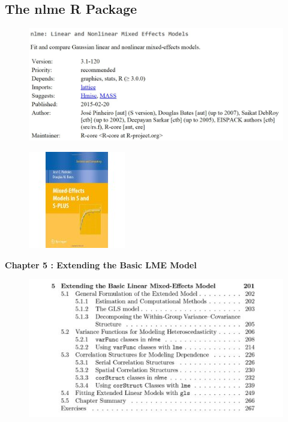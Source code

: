 \documentclass[compress]{beamer}        %
\begin{document}
	\subsection{The nlme R Package}					
				\begin{frame}
					\begin{figure}
						\centering
						\includegraphics[width=1.1\linewidth]{images/CRAN-nlme}
						
					\end{figure}
					
				\end{frame}
				\begin{frame}
					\begin{figure}
						\centering
						\includegraphics[width=0.55\linewidth]{images/PinheiroBates}
						
					\end{figure}
				\end{frame}
				\begin{frame}
					\noindent \textbf{Chapter 5 :  Extending the Basic LME Model}
					\begin{figure}
						\centering
						\includegraphics[width=1.0\linewidth]{images/PBchap4}
					\end{figure}
					
				\end{frame}
\end{document}
